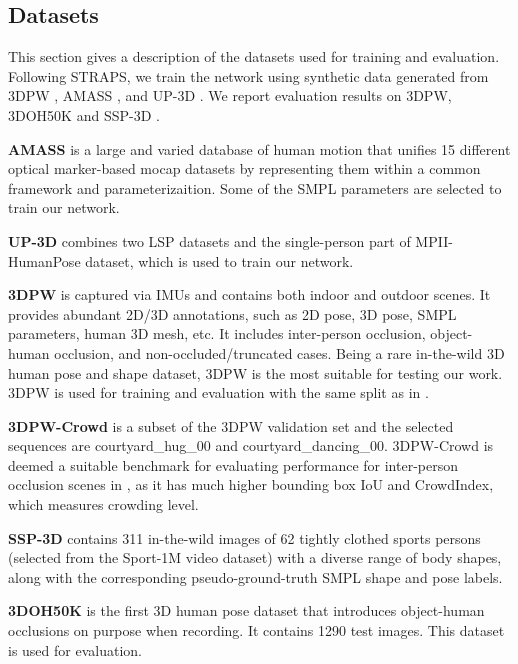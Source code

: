 \documentclass[journal]{IEEEtran}
\begin{document}
\subsection{Datasets}
This section gives a description of the datasets used for training and evaluation.
Following STRAPS\cite{STRAPS2020BMVC}, we train the network using synthetic data generated from 3DPW \cite{vonMarcard2018}, AMASS \cite{AMASS:ICCV:2019}, and UP-3D \cite{lassner2017unite}. We report evaluation results on 3DPW, 3DOH50K \cite{zhang2020object} and SSP-3D \cite{STRAPS2020BMVC}.

\textbf{AMASS} is a large and varied database of human motion that unifies 15 different optical marker-based mocap datasets by representing them within a common framework and parameterizaition. Some of the SMPL parameters are selected to train our network.

\textbf{UP-3D} combines two LSP datasets and the single-person part of MPII-HumanPose dataset, which is used to train our network.

\textbf{3DPW} is captured via IMUs and contains both indoor and outdoor scenes. It provides abundant 2D/3D annotations, such as 2D pose, 3D pose, SMPL parameters, human 3D mesh, etc. It includes inter-person occlusion, object-human occlusion, and non-occluded/truncated cases. Being a rare in-the-wild 3D human pose and shape dataset, 3DPW is the most suitable for testing our work. 3DPW is used for training and evaluation with the same split as in \cite{STRAPS2020BMVC}.

\textbf{3DPW-Crowd} is a subset of the 3DPW validation set and the selected sequences are courtyard\_hug\_00 and courtyard\_dancing\_00. 3DPW-Crowd is deemed a suitable benchmark for evaluating performance for inter-person occlusion scenes in \cite{choi20213dcrowdnet}, as it has much higher bounding box IoU and CrowdIndex\cite{li2019crowdpose}, which measures crowding level.

\textbf{SSP-3D} contains 311 in-the-wild images of 62 tightly clothed sports persons (selected from the Sport-1M video dataset) with a diverse range of body shapes, along with the corresponding pseudo-ground-truth SMPL shape and pose labels. 


\textbf{3DOH50K} is the first 3D human pose dataset that introduces object-human occlusions on purpose when recording. It contains 1290 test images. This dataset is used for evaluation.
\end{document}
